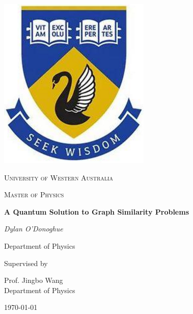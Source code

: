 \begin{titlepage}


\thispagestyle{empty}
\setlength\headheight{0pt} 
\begin{center}

\begin{center}
\includegraphics[width=0.25\linewidth]{Figs/uwa.PNG}            
\end{center}	

        \vspace{0.25cm}
        {\scshape\LARGE University of Western Australia \par}
        \vspace{0.25cm}
        {\scshape\Large Master of Physics \par}
        \vspace{0.5cm}

        {\Large\bfseries A Quantum Solution to Graph Similarity Problems\par}
        
        \vspace{0.5cm}
        {\Large\itshape Dylan O'Donoghue\par}
        Department of Physics
        \vspace{0.25cm}

\vspace{1cm}
Supervised by\par
Prof. Jingbo Wang \\
Department of Physics\par
\vspace{1.5cm}
\large
\today

\end{center}

\clearpage
\restoregeometry
\end{titlepage}

